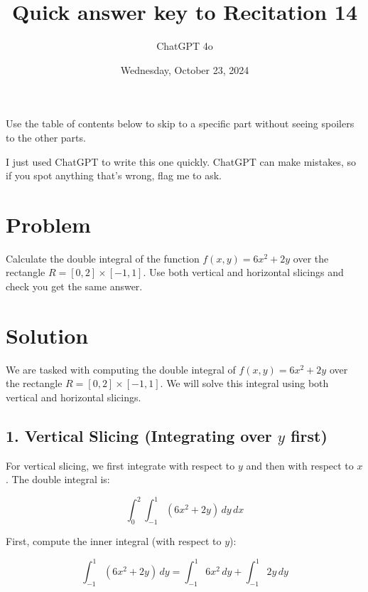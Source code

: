 \documentclass[11pt]{article}
\begin{document}
\title{Quick answer key to Recitation 14}
\author{ChatGPT 4o}
\date{Wednesday, October 23, 2024}
\maketitle

Use the table of contents below to skip to a specific part
without seeing spoilers to the other parts.

I just used ChatGPT to write this one quickly.
ChatGPT can make mistakes, so if you spot anything that's wrong, flag me to ask.

\tableofcontents



\maketitle

\newpage

\section{Problem}
Calculate the double integral of the function \( f(x, y) = 6x^2 + 2y \) over the rectangle \( R = [0, 2] \times [-1, 1] \). Use both vertical and horizontal slicings and check you get the same answer.

\newpage

\section{Solution}

We are tasked with computing the double integral of \( f(x, y) = 6x^2 + 2y \) over the rectangle \( R = [0, 2] \times [-1, 1] \). We will solve this integral using both vertical and horizontal slicings.

\newpage

\subsection{1. Vertical Slicing (Integrating over \(y\) first)}

For vertical slicing, we first integrate with respect to \(y\) and then with respect to \(x\). The double integral is:

\[
\int_0^2 \int_{-1}^1 (6x^2 + 2y) \, dy \, dx
\]

First, compute the inner integral (with respect to \(y\)):

\[
\int_{-1}^1 (6x^2 + 2y) \, dy = \int_{-1}^1 6x^2 \, dy + \int_{-1}^1 2y \, dy
\]
\end{document}
